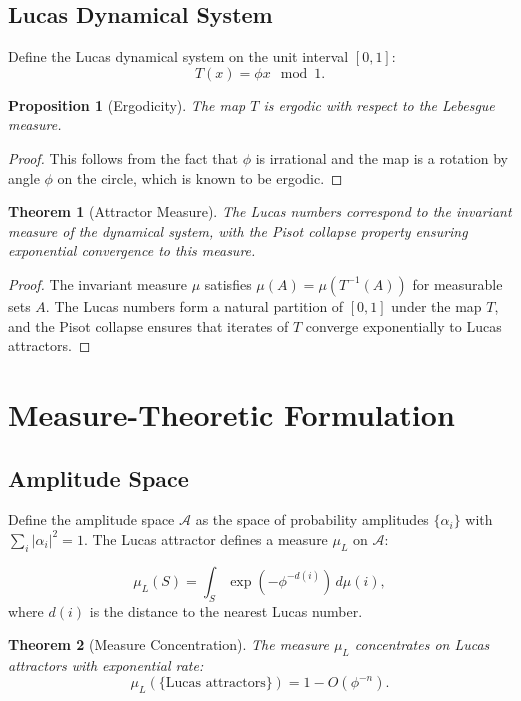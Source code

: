 \documentclass{article}
\newtheorem{theorem}{Theorem}
\newtheorem{proposition}{Proposition}
\theoremstyle{remark}
\begin{document}
\subsection{Lucas Dynamical System}

Define the Lucas dynamical system on the unit interval $[0,1]$:
\[
T(x) = \phi x \mod 1.
\]

\begin{proposition}[Ergodicity]
The map $T$ is ergodic with respect to the Lebesgue measure.
\end{proposition}

\begin{proof}
This follows from the fact that $\phi$ is irrational and the map is a rotation by angle $\phi$ on the circle, which is known to be ergodic.
\end{proof}

\begin{theorem}[Attractor Measure]
The Lucas numbers correspond to the invariant measure of the dynamical system, with the Pisot collapse property ensuring exponential convergence to this measure.
\end{theorem}

\begin{proof}
The invariant measure $\mu$ satisfies $\mu(A) = \mu(T^{-1}(A))$ for measurable sets $A$. The Lucas numbers form a natural partition of $[0,1]$ under the map $T$, and the Pisot collapse ensures that iterates of $T$ converge exponentially to Lucas attractors.
\end{proof}

\section{Measure-Theoretic Formulation}

\subsection{Amplitude Space}

Define the amplitude space $\mathcal{A}$ as the space of probability amplitudes $\{\alpha_i\}$ with $\sum_i |\alpha_i|^2 = 1$. The Lucas attractor defines a measure $\mu_L$ on $\mathcal{A}$:

\[
\mu_L(S) = \int_S \exp(-\phi^{-d(i)}) \, d\mu(i),
\]
where $d(i)$ is the distance to the nearest Lucas number.

\begin{theorem}[Measure Concentration]
The measure $\mu_L$ concentrates on Lucas attractors with exponential rate:
\[
\mu_L(\{\text{Lucas attractors}\}) = 1 - O(\phi^{-n}).
\]
\end{theorem}
\end{document}
